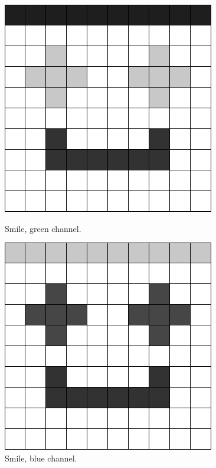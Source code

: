\begin{figure}[ht]
    \begin{minipage}[t]{0.45\linewidth}
        \centering
        \includegraphics[width=\textwidth]{images/smile/smile-green-channel.jpg}
        \caption{Smile, green channel.}
        \label{fig:smile-green}
    \end{minipage}
    \hspace{0.5cm}
    \begin{minipage}[t]{0.45\linewidth}
        \centering
        \includegraphics[width=\textwidth]{images/smile/smile-blue-channel.jpg}
        \caption{Smile, blue channel.}
        \label{fig:smile-blue}
    \end{minipage}
\end{figure}

